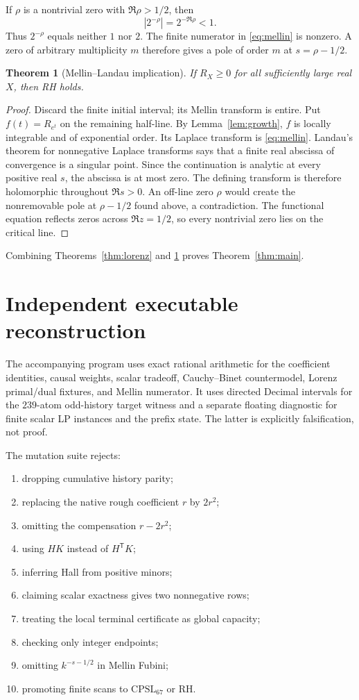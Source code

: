 \documentclass[11pt]{article}
\newtheorem{theorem}{Theorem}[section]
\newcommand{\CPSL}{\mathrm{CPSL}_{67}}
\newcommand{\1}{\mathbf 1}
\begin{document}
If $\rho$ is a nontrivial zero with $\Re\rho>1/2$, then
\[
|2^{-\rho}|=2^{-\Re\rho}<1.
\]
Thus $2^{-\rho}$ equals neither $1$ nor $2$.  The finite numerator in \eqref{eq:mellin} is nonzero.  A zero of arbitrary multiplicity $m$ therefore gives a pole of order $m$ at $s=\rho-1/2$.

\begin{theorem}[Mellin--Landau implication]\label{thm:landau}
If $R_X\ge0$ for all sufficiently large real $X$, then RH holds.
\end{theorem}
\begin{proof}
Discard the finite initial interval; its Mellin transform is entire.  Put $f(t)=R_{e^t}$ on the remaining half-line.  By Lemma~\ref{lem:growth}, $f$ is locally integrable and of exponential order.  Its Laplace transform is \eqref{eq:mellin}.  Landau's theorem for nonnegative Laplace transforms \cite{widder,titchmarsh} says that a finite real abscissa of convergence is a singular point.  Since the continuation is analytic at every positive real $s$, the abscissa is at most zero.  The defining transform is therefore holomorphic throughout $\Re s>0$.  An off-line zero $\rho$ would create the nonremovable pole at $\rho-1/2$ found above, a contradiction.  The functional equation reflects zeros across $\Re z=1/2$, so every nontrivial zero lies on the critical line.
\end{proof}

Combining Theorems~\ref{thm:lorenz} and \ref{thm:landau} proves Theorem~\ref{thm:main}.

\section{Independent executable reconstruction}

The accompanying program uses exact rational arithmetic for the coefficient identities, causal weights, scalar tradeoff, Cauchy--Binet countermodel, Lorenz primal/dual fixtures, and Mellin numerator.  It uses directed Decimal intervals for the $239$-atom odd-history target witness and a separate floating diagnostic for finite scalar LP instances and the prefix state.  The latter is explicitly falsification, not proof.

The mutation suite rejects:
\begin{enumerate}[label=(\arabic*)]
\item dropping cumulative history parity;
\item replacing the native rough coefficient $r$ by $2r^2$;
\item omitting the compensation $r-2r^2$;
\item using $HK$ instead of $H^{\mathsf T}K$;
\item inferring Hall from positive minors;
\item claiming scalar exactness gives two nonnegative rows;
\item treating the local terminal certificate as global capacity;
\item checking only integer endpoints;
\item omitting $k^{-s-1/2}$ in Mellin Fubini;
\item promoting finite scans to $\CPSL$ or RH.
\end{enumerate}
\end{document}
